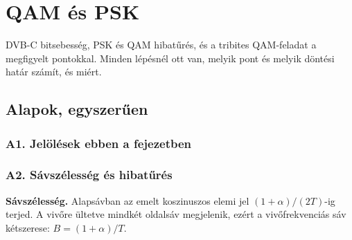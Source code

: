 \setcounter{chapter}{1}
\chapter{\texorpdfstring{QAM és PSK}{QAM és PSK}}\label{f2}
DVB-C bitsebesség, PSK és QAM hibatűrés, és a tribites QAM-feladat a megfigyelt pontokkal. Minden lépésnél ott van, melyik pont és melyik döntési határ számít, és miért.

\section{Alapok, egyszerűen}
\subsection{\texorpdfstring{A1. Jelölések ebben a fejezetben}{A1. Jelölések ebben a fejezetben}}\label{b2-jel}
\par{}\par

\subsection{\texorpdfstring{A2. Sávszélesség és hibatűrés}{A2. Sávszélesség és hibatűrés}}\label{b2-qam}
\textbf{Sávszélesség.} Alapsávban az emelt koszinuszos elemi jel $(1+\alpha)/(2T)$-ig terjed. A vivőre ültetve mindkét oldalsáv megjelenik, ezért a vivőfrekvenciás sáv kétszerese: $B=(1+\alpha)/T$.


